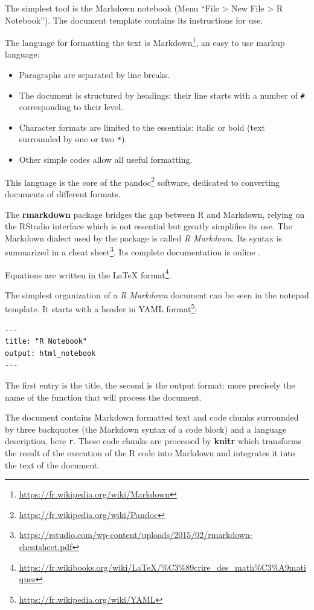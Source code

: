 \documentclass[
  12pt,
  american,
  a4paper,
  extrafontsizes,onecolumn,openright
  ]{memoir}
\providecommand{\tightlist}{%
  \setlength{\itemsep}{0pt}\setlength{\parskip}{0pt}}
\newlength{\rf}
\begin{document}
The simplest tool is the Markdown notebook (Menu \enquote{File \textgreater{} New File \textgreater{} R Notebook}).
The document template contains its instructions for use.

The language for formatting the text is Markdown\footnote{\url{https://fr.wikipedia.org/wiki/Markdown}}, an easy to use markup language:

\begin{itemize}
\tightlist
\item
  Paragraphs are separated by line breaks.
\item
  The document is structured by headings: their line starts with a number of \texttt{\#} corresponding to their level.
\item
  Character formats are limited to the essentials: italic or bold (text surrounded by one or two \texttt{*}).
\item
  Other simple codes allow all useful formatting.
\end{itemize}

This language is the core of the pandoc\footnote{\url{https://fr.wikipedia.org/wiki/Pandoc}} software, dedicated to converting documents of different formats.

The \textbf{rmarkdown} package \autocite{Xie2015} bridges the gap between R and Markdown, relying on the RStudio interface which is not essential but greatly simplifies its use.
The Markdown dialect used by the package is called \emph{R Markdown}.
Its syntax is summarized in a cheat sheet\footnote{\url{https://rstudio.com/wp-content/uploads/2015/02/rmarkdown-cheatsheet.pdf}}.
Its complete documentation is online \autocite{Xie2018}.

Equations are written in the LaTeX format\footnote{\url{https://fr.wikibooks.org/wiki/LaTeX/\%C3\%89crire_des_math\%C3\%A9matiques}}.

The simplest organization of a \emph{R Markdown} document can be seen in the notepad template.
It starts with a header in YAML format\footnote{\url{https://fr.wikipedia.org/wiki/YAML}}:

\begin{verbatim}
---
title: "R Notebook"
output: html_notebook
---
\end{verbatim}

The first entry is the title, the second is the output format: more precisely the name of the function that will process the document.

The document contains Markdown formatted text and code chunks surrounded by three backquotes (the Markdown syntax of a code block) and a language description, here \texttt{r}.
These code chunks are processed by \textbf{knitr} which transforms the result of the execution of the R code into Markdown and integrates it into the text of the document.
\end{document}
